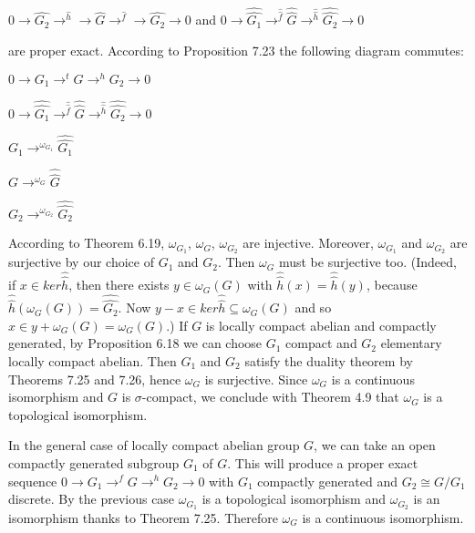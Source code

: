 \documentclass[12pt]{article}
\begin{document}
    $0 \to \hat{G_2} \to^{\hat{h}} \to \hat{G} \to^{\hat{f}} \to \hat{G_2} \to 0$ and $0 \to \hat{\hat{G_1}} \to^{\hat{\hat{f}}} \hat{\hat{G}} \to^{\hat{\hat{h}}} \hat{\hat{G_2}} \to 0$


are proper exact. According to Proposition 7.23 the following diagram commutes:




$0 \to G_1 \to^t G \to^h G_2 \to 0$


$0 \to \hat{\hat{G_1}} \to^{\hat{\hat{f}}} \hat{\hat{G}} \to^{\hat{\hat{h}}} \hat{\hat{G_2}} \to 0$


$G_1 \to^{\omega_{G_1}} \hat{\hat{G_1}}$

$G \to^{\omega_G} \hat{\hat{G}}$

$G_2 \to^{\omega_{G_2}} \hat{\hat{G_2}}$


According to Theorem 6.19, $\omega_{G_1}$, $\omega_G$, $\omega_{G_2}$ are injective. Moreover, $\omega_{G_1}$ and $\omega_{G_2}$ are surjective by our
choice of $G_1$ and $G_2$. Then $\omega_G$ must be surjective too. (Indeed, if $x \in ker \hat{\hat{h}}$, then there exists $y \in \omega_G(G)$ with
$\hat{\hat{h}}(x) = \hat{\hat{h}}(y)$, because $\hat{\hat{h}}(\omega_G(G)) = \hat{\hat{G_2}}$. Now $y - x \in ker \hat{\hat{h}} \subseteq \omega_G(G)$ and so $x \in y + \omega_G(G) = \omega_G(G)$.)
If $G$ is locally compact abelian and compactly generated, by Proposition 6.18 we can choose $G_1$ compact
and $G_2$ elementary locally compact abelian. Then $G_1$ and $G_2$ satisfy the duality theorem by Theorems 7.25
and 7.26, hence $\omega_G$ is surjective. Since $\omega_G$ is a continuous isomorphism and $G$ is $\sigma$-compact, we conclude with
Theorem 4.9 that $\omega_G$ is a topological isomorphism.


    In the general case of locally compact abelian group $G$, we can take an open compactly generated subgroup
$G_1$ of $G$. This will produce a proper exact sequence $0 \to G_1 \to^f G \to^h G_2 \to 0$ with $G_1$ compactly generated and
$G_2 \cong G/G_1$ discrete. By the previous case $\omega_{G_1}$ is a topological isomorphism and $\omega_{G_2}$ is an isomorphism thanks
to Theorem 7.25. Therefore $\omega_G$ is a continuous isomorphism.
\end{document}
